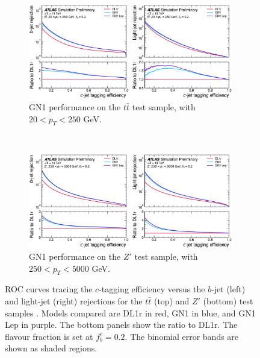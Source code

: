\begin{figure}[h!]
  \centering
  \begin{subfigure}[b]{0.98\textwidth}
      \centering
      \includegraphics[width=0.98\textwidth]{Images/FTAG/GN/GN1/ROC/ttc.png}
      \caption{GN1 performance on the $t\bar{t}$ test sample, with $20 < p_T < 250$ GeV.} 
      \label{fig:GN1ttc}
  \end{subfigure}\\
  \begin{subfigure}[b]{0.98\textwidth}
    \centering
      \includegraphics[width=0.98\textwidth]{Images/FTAG/GN/GN1/ROC/zpc.png}
      \caption{GN1 performance on the $Z'$ test sample, with $250 < p_T < 5000$ GeV.} 
      \label{fig:GN1zpc}
  \end{subfigure}
  \caption{ROC curves tracing the $c$-tagging efficiency versus the $b$-jet (left) and light-jet (right) rejections for the $t\bar{t}$ (top) and $Z'$ (bottom) test samples \cite{ATL-PHYS-PUB-2022-027}. Models compared are DL1r in red, GN1 in blue, and GN1 Lep in purple. The bottom panels show the ratio to DL1r. The flavour fraction is set at $f^c_b = 0.2$. The binomial error bands are shown as shaded regions.}
  \label{fig:GN1rocc}
\end{figure} 

